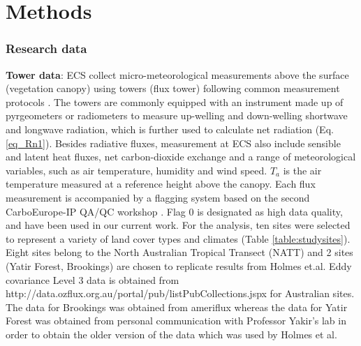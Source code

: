 \documentclass[fleqn,10pt]{wlscirep}
\begin{document}
 








\section{Methods}  \label{sec:Methods}
\subsubsection{Research data}
\textbf{Tower data}:
ECS collect micro-meteorological measurements above the surface (vegetation canopy) using towers (flux tower) following common measurement protocols \cite{baldocchi2001fluxnet}. The towers are commonly equipped with an instrument made up of pyrgeometers or radiometers to measure up-welling and down-welling shortwave and longwave radiation, which is further used to calculate net radiation (Eq. \ref{eq_Rn1}). Besides radiative fluxes, measurement at ECS also include sensible and latent heat fluxes, net carbon-dioxide exchange and a range of meteorological variables, such as air temperature, humidity and wind speed. $T_{a}$ is the air temperature measured at a reference height above the canopy. Each flux measurement is accompanied by a flagging system based on the second CarboEurope-IP QA/QC workshop \cite{gilberto2020fluxnet2015}. Flag 0 is designated as high data quality, and have been used in our current work. For the analysis, ten sites were selected to represent a variety of land cover types and climates (Table \ref{table:studysites}). Eight sites belong to the North Australian Tropical Transect (NATT) and 2 sites (Yatir Forest, Brookings) are chosen to replicate results from Holmes et.al\cite{holmes_land_2009-1}. Eddy covariance Level 3 data is obtained from http://data.ozflux.org.au/portal/pub/listPubCollections.jspx for Australian sites. The data for Brookings was obtained from ameriflux whereas the data for Yatir Forest was obtained from personal communication with Professor Yakir's lab in order to obtain the older version of the data which was used by Holmes et al.\cite{holmes_land_2009}%
\end{document}
